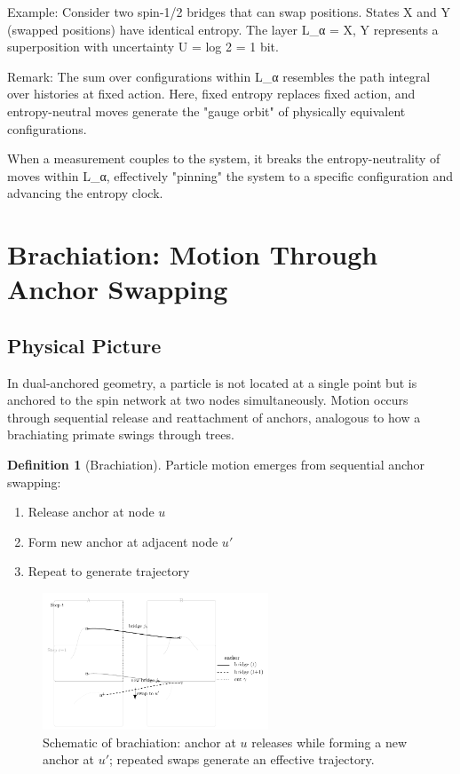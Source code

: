 \documentclass[11pt]{article}
\theoremstyle{plain}
\theoremstyle{definition}
\newtheorem{definition}[theorem]{Definition}
\begin{document}

Example: Consider two spin-1/2 bridges that can swap positions.
States X and Y (swapped positions) have identical entropy.
The layer L_α = {X, Y} represents a superposition with
uncertainty U = log 2 = 1 bit.

Remark: The sum over configurations within L_α resembles
the path integral over histories at fixed action. Here,
fixed entropy replaces fixed action, and entropy-neutral
moves generate the "gauge orbit" of physically equivalent
configurations.

When a measurement couples to the system, it breaks the
entropy-neutrality of moves within L_α, effectively
"pinning" the system to a specific configuration and
advancing the entropy clock.

\section{Brachiation: Motion Through Anchor Swapping}
\label{sec:brachiation}

\subsection{Physical Picture}

In dual-anchored geometry, a particle is not located at a single point but is anchored to the spin network at two nodes simultaneously. Motion occurs through sequential release and reattachment of anchors, analogous to how a brachiating primate swings through trees.

\begin{definition}[Brachiation]
  Particle motion emerges from sequential anchor swapping:
  \begin{enumerate}
    \item Release anchor at node $u$
    \item Form new anchor at adjacent node $u'$
    \item Repeat to generate trajectory
  \end{enumerate}
\end{definition}

\begin{figure}[h]
  \centering
  \includegraphics[width=0.6\textwidth]{fig_brachiation_schematic.pdf}
  \caption{Schematic of brachiation: anchor at $u$ releases while forming a new anchor at $u'$; repeated swaps generate an effective trajectory.}
  \label{fig:brachiation}
\end{figure}
\end{document}
